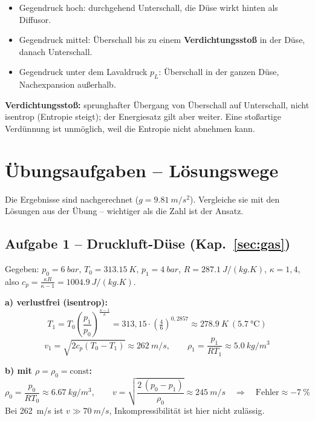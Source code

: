 \documentclass[11pt,a4paper]{article}
\newenvironment{bild}{\par\medskip\noindent\begin{minipage}{\linewidth}\centering}{\end{minipage}\par\medskip}
\begin{document}
\begin{itemize}
\item Gegendruck hoch: durchgehend Unterschall, die Düse wirkt hinten als Diffusor.
\item Gegendruck mittel: Überschall bis zu einem \textbf{Verdichtungsstoß} in der Düse, danach Unterschall.
\item Gegendruck unter dem Lavaldruck $p_L$: Überschall in der ganzen Düse, Nachexpansion außerhalb.
\end{itemize}

\textbf{Verdichtungsstoß:} sprunghafter Übergang von Überschall auf Unterschall, nicht isentrop (Entropie steigt); der Energiesatz gilt aber weiter. Eine stoßartige Verdünnung ist unmöglich, weil die Entropie nicht abnehmen kann.

\section{Übungsaufgaben -- Lösungswege}

Die Ergebnisse sind nachgerechnet ($g = \SI{9.81}{m/s^2}$). Vergleiche sie mit den Lösungen aus der Übung -- wichtiger als die Zahl ist der Ansatz.

\subsection*{Aufgabe 1 -- Druckluft-Düse (Kap.~\ref{sec:gas})}

\begin{bild}

\end{bild}

Gegeben: $p_0 = \SI{6}{bar}$, $T_0 = \SI{313.15}{K}$, $p_1 = \SI{4}{bar}$, $R = \SI{287.1}{J/(kg.K)}$, $\kappa = 1{,}4$, also $c_p = \frac{\kappa R}{\kappa - 1} = \SI{1004.9}{J/(kg.K)}$.

\textbf{a) verlustfrei (isentrop):}
\[
T_1 = T_0\left(\frac{p_1}{p_0}\right)^{\frac{\kappa-1}{\kappa}} = 313{,}15\cdot\left(\tfrac{4}{6}\right)^{0{,}2857} \approx \SI{278.9}{K}\ (\SI{5.7}{\celsius})
\]
\[
v_1 = \sqrt{2 c_p (T_0 - T_1)} \approx \SI{262}{m/s},
\qquad
\rho_1 = \frac{p_1}{R T_1} \approx \SI{5.0}{kg/m^3}
\]

\textbf{b) mit $\rho = \rho_0 = \text{const}$:}
\[
\rho_0 = \frac{p_0}{R T_0} \approx \SI{6.67}{kg/m^3},
\qquad
v = \sqrt{\frac{2\,(p_0 - p_1)}{\rho_0}} \approx \SI{245}{m/s}
\quad\Rightarrow\quad \text{Fehler} \approx \SI{-7}{\percent}
\]
Bei \SI{262}{m/s} ist $v \gg \SI{70}{m/s}$, Inkompressibilität ist hier nicht zulässig.
\end{document}
